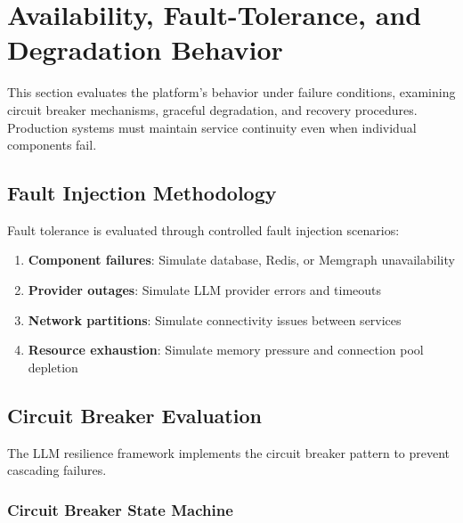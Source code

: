 
\section{Availability, Fault-Tolerance, and Degradation Behavior}
\label{sec:availability-ft}

This section evaluates the platform's behavior under failure conditions, examining circuit breaker mechanisms, graceful degradation, and recovery procedures. Production systems must maintain service continuity even when individual components fail.

\subsection{Fault Injection Methodology}

Fault tolerance is evaluated through controlled fault injection scenarios:

\begin{enumerate}
    \item \textbf{Component failures}: Simulate database, Redis, or Memgraph unavailability
    \item \textbf{Provider outages}: Simulate LLM provider errors and timeouts
    \item \textbf{Network partitions}: Simulate connectivity issues between services
    \item \textbf{Resource exhaustion}: Simulate memory pressure and connection pool depletion
\end{enumerate}

\subsection{Circuit Breaker Evaluation}

The LLM resilience framework implements the circuit breaker pattern to prevent cascading failures.

\subsubsection{Circuit Breaker State Machine}

